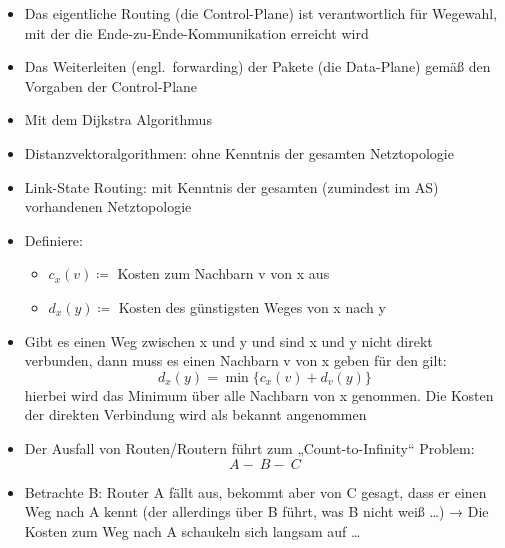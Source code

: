 
\begin{itemize}
    \item Das eigentliche Routing (die Control-Plane) ist verantwortlich für Wegewahl, mit der die Ende-zu-Ende-Kommunikation erreicht wird
    \item Das Weiterleiten (engl.\ forwarding) der Pakete (die Data-Plane) gemäß den Vorgaben der Control-Plane
\end{itemize}

\begin{itemize}
    \item Mit dem Dijkstra Algorithmus
\end{itemize}

\begin{itemize}
    \item Distanzvektoralgorithmen: ohne Kenntnis der gesamten Netztopologie
    \item Link-State Routing: mit Kenntnis der gesamten (zumindest im AS) vorhandenen Netztopologie
\end{itemize}

\begin{itemize}
    \item Definiere:
    \begin{itemize}
        \item \(c_x(v) \coloneqq\) Kosten zum Nachbarn v von x aus
        \item \(d_x(y) \coloneqq\) Kosten des günstigsten Weges von x nach y
    \end{itemize}
    \item Gibt es einen Weg zwischen x und y und sind x und y nicht direkt verbunden, dann muss es einen Nachbarn v von x geben für den gilt:
    \[d_x(y) = \min \{c_x(v) + d_v(y) \}\]
    hierbei wird das Minimum über alle Nachbarn von x genommen.
    Die Kosten der direkten Verbindung wird als bekannt angenommen
\end{itemize}

\begin{itemize}
    \item Der Ausfall von Routen/Routern führt zum „Count-to-Infinity“ Problem: \[A -\: B -\: C\]
    \item Betrachte B: Router A fällt aus, bekommt aber von C gesagt, dass er einen Weg nach A kennt (der allerdings über B führt, was B nicht weiß \ldots)
    → Die Kosten zum Weg nach A schaukeln sich langsam auf \ldots
\end{itemize}

